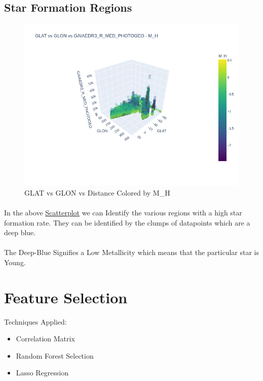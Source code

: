 \documentclass{article}
\begin{document}
\subsection{Star Formation Regions}
\begin{figure}[H]
    \centering
    \label{fig:5}
    \includegraphics[width=\textwidth]{Images/GLAT vs GLON vs Distance - M_H.png}
    \caption{GLAT vs GLON vs Distance Colored by M_H}
\end{figure}
\paragraph{}
In the above \hyperref[fig:3]{Scatterplot} we can Identify the various regions with a high star formation rate. They can be identified by the clumps of datapoints which are a deep blue.
\paragraph{}
The Deep-Blue Signifies a Low Metallicity which means that the particular star is Young.
\newpage
\section{Feature Selection}\label{feature-selection}

Techniques Applied:
\begin{itemize}
  \item Correlation Matrix
  \item Random Forest Selection
  \item Lasso Regression
\end{itemize}
\end{document}
